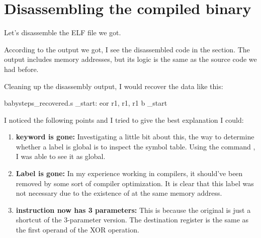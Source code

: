 \section{Disassembling the compiled binary}
Let's disassemble the ELF file we got.


According to the output we got, I see the disassembled code in the  section.
The output includes memory addresses, but its logic is the same as the source code we had before.

Cleaning up the disassembly output, I would recover the data like this:

\begin{codebox}[asm]{babysteps_recovered.s}
_start:
    eor     r1, r1, r1
    b       _start
\end{codebox}

I noticed the following points and I tried to give the best explanation I could:

\begin{enumerate}
    \item \textbf{ keyword is gone:} Investigating a little bit about this, the way to determine whether a label is global is to inspect the symbol table. Using the command , I was able to see it as global.
    \item \textbf{Label  is gone:} In my experience working in compilers, it should've been removed by some sort of compiler optimization. It is clear that this label was not necessary due to the existence of  at the same memory address.
    \item \textbf{ instruction now has 3 parameters:} This is because the original  is just a shortcut of the 3-parameter version. The destination register is the same as the first operand of the XOR operation.
\end{enumerate}

